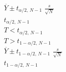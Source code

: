 \documentclass[12pt]{article}
\begin{document}
\pagestyle{empty}
\Large
{}
\pagecolor{ehandbook}

\boldmath
$\displaystyle{\overline{Y} \pm t_{\alpha/2, \, N-1} \,\, \frac{s}{\sqrt{N}} }$ \\

$\displaystyle{t_{\alpha/2, \, N-1}}$ \\

$\displaystyle{T < t_{\alpha/2, \, N-1}}$ \\

$\displaystyle{T > t_{1-\alpha/2, \, N-1}}$ \\

$\displaystyle{\overline{Y} \pm t_{1-\alpha/2, \, N-1} \,\, \frac{s}{\sqrt{N}} }$ \\

$\displaystyle{t_{1-\alpha/2, \, N-1}}$ \\
 
\end{document}

